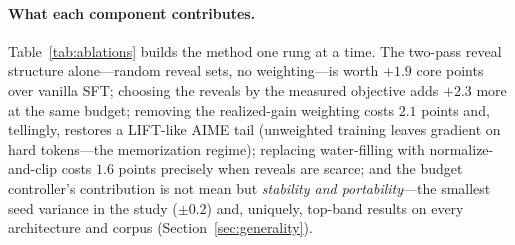 \documentclass{article} %
\begin{document}
\paragraph{What each component contributes.} Table~\ref{tab:ablations} builds the method one rung at a time. The two-pass reveal structure alone---random reveal sets, no weighting---is worth $+1.9$ core points over vanilla SFT; choosing the reveals by the measured objective adds $+2.3$ more at the same budget; removing the realized-gain weighting costs $2.1$ points and, tellingly, restores a LIFT-like AIME tail (unweighted training leaves gradient on hard tokens---the memorization regime); replacing water-filling with normalize-and-clip costs $1.6$ points precisely when reveals are scarce; and the budget controller's contribution is not mean but \emph{stability and portability}---the smallest seed variance in the study ($\pm 0.2$) and, uniquely, top-band results on every architecture and corpus (Section~\ref{sec:generality}).

\begin{table}[t]
\caption{\textbf{Component ladder} (LLaDA-8B, s1K; core selected~/~final; mean $\pm$ sd over seeds 42--44 unless $^\ddagger$single-seed).}
\label{tab:ablations}
\begin{center}
\end{center}
\end{table}
\end{document}
